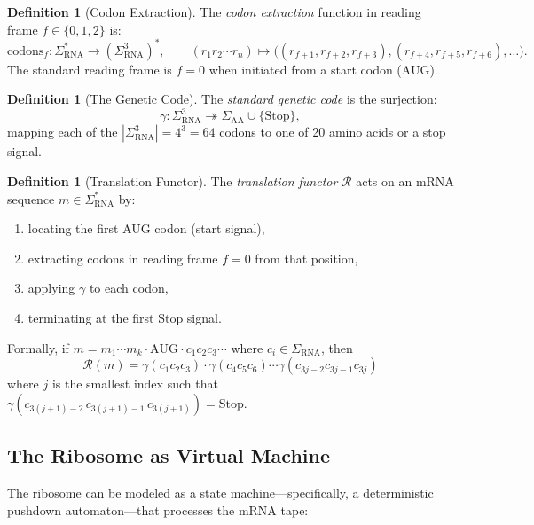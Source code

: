 \documentclass[12pt,a4paper]{article}
\theoremstyle{definition}
\newtheorem{definition}[theorem]{Definition}
\begin{document}
\begin{definition}[Codon Extraction]\label{def:codon-extraction}
The \emph{codon extraction} function in reading frame $f \in \{0, 1, 2\}$ is:
\[
  \mathrm{codons}_f \colon \Sigma_{\mathrm{RNA}}^* \to (\Sigma_{\mathrm{RNA}}^3)^*,
  \qquad
  (r_1 r_2 \cdots r_n) \mapsto
  \bigl( (r_{f+1}, r_{f+2}, r_{f+3}), (r_{f+4}, r_{f+5}, r_{f+6}), \ldots \bigr).
\]
The standard reading frame is $f = 0$ when initiated from a start codon (AUG).
\end{definition}

\begin{definition}[The Genetic Code]\label{def:genetic-code}
The \emph{standard genetic code} is the surjection:
\[
  \gamma \colon \Sigma_{\mathrm{RNA}}^3 \twoheadrightarrow \Sigma_{\mathrm{AA}} \cup \{\text{Stop}\},
\]
mapping each of the $|\Sigma_{\mathrm{RNA}}^3| = 4^3 = 64$ codons to one of 20 amino acids or a stop signal.
\end{definition}

\begin{definition}[Translation Functor]\label{def:translation}
The \emph{translation functor} $\mathcal{R}$ acts on an mRNA sequence $m \in \Sigma_{\mathrm{RNA}}^*$ by:
\begin{enumerate}[label=(\alph*)]
  \item locating the first AUG codon (start signal),
  \item extracting codons in reading frame $f=0$ from that position,
  \item applying $\gamma$ to each codon,
  \item terminating at the first Stop signal.
\end{enumerate}
Formally, if $m = m_1 \cdots m_k \cdot \text{AUG} \cdot c_1 c_2 c_3 \cdots$ where $c_i \in \Sigma_\mathrm{RNA}$, then
\[
  \mathcal{R}(m) = \gamma(c_1 c_2 c_3) \cdot \gamma(c_4 c_5 c_6) \cdots \gamma(c_{3j-2} c_{3j-1} c_{3j})
\]
where $j$ is the smallest index such that $\gamma(c_{3(j+1)-2}\, c_{3(j+1)-1}\, c_{3(j+1)}) = \text{Stop}$.
\end{definition}

\subsection{The Ribosome as Virtual Machine}

The ribosome can be modeled as a state machine---specifically, a deterministic pushdown automaton---that processes the mRNA tape:
\end{document}
